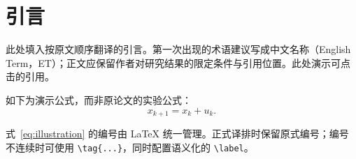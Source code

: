 \section{引言}\label{sec:introduction}

此处填入按原文顺序翻译的引言。第一次出现的术语建议写成中文名称（English Term，ET）；正文应保留作者对研究结果的限定条件与引用位置。此处演示可点击的引用\cite{sample-entry}。

如下为演示公式，而非原论文的实验公式：
\begin{equation}
    x_{k+1}=x_k+u_k.
    \label{eq:illustration}
\end{equation}

式~\eqref{eq:illustration} 的编号由 \LaTeX{} 统一管理。正式译排时保留原式编号；编号不连续时可使用 \verb|\tag{...}|，同时配置语义化的 \verb|\label|。

